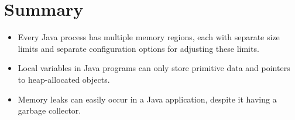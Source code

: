 \section{Summary}


\begin{itemize}
  \item Every Java process has multiple memory regions, each with separate size
  limits and separate configuration options for adjusting these limits.
  \item Local variables in Java programs can only store primitive data and
  pointers to heap-allocated objects.
  \item Memory leaks can easily occur in a Java application, despite it having a
  garbage collector.
\end{itemize}